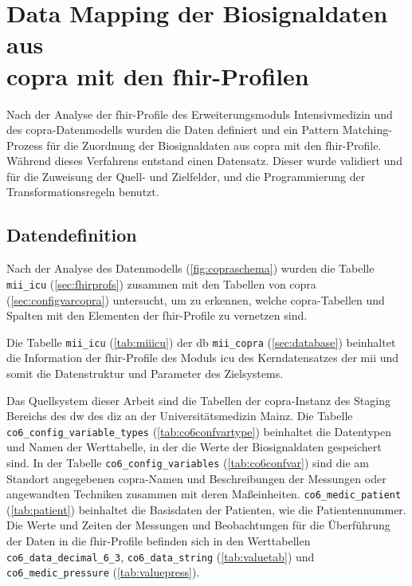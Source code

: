\section{Data Mapping der Biosignaldaten aus \\ \acs{copra} mit den \acs{fhir}-Profilen} \label{sec:datamappingicucopra}

Nach der Analyse der \ac{fhir}-Profile des Erweiterungsmoduls \glqq Intensivmedizin\grqq{} und des \ac{copra}-Datenmodells wurden die Daten definiert und ein Pattern Matching-Prozess für die Zuordnung der Biosignaldaten aus \ac{copra} mit den \ac{fhir}-Profile. Während dieses Verfahrens entstand einen Datensatz. Dieser wurde validiert und für die Zuweisung der Quell- und Zielfelder, und die Programmierung der Transformationsregeln benutzt.

\subsection{Datendefinition} \label{subsec:datadef}

Nach der Analyse des Datenmodells (\ref{fig:copraschema}) wurden die Tabelle \texttt{mii\_icu} (\ref{sec:fhirprofs}) zusammen mit den Tabellen von \ac{copra} (\ref{sec:configvarcopra}) untersucht, um zu erkennen, welche \ac{copra}-Tabellen und Spalten mit den Elementen der \ac{fhir}-Profile zu vernetzen sind.

Die Tabelle \texttt{mii\_icu} (\ref{tab:miiicu}) der \ac{db} \texttt{mii\_copra} (\ref{sec:database}) beinhaltet die Information der \ac{fhir}-Profile des Moduls \ac{icu} des Kerndatensatzes der \ac{mii} und somit die Datenstruktur und Parameter des Zielsystems.

Das Quellsystem dieser Arbeit sind die Tabellen der \ac{copra}-Instanz des Staging Bereichs des \ac{dw} des \ac{diz} an der Universitätsmedizin Mainz. Die Tabelle \texttt{co6\_config\_variable\_types} (\ref{tab:co6confvartype}) beinhaltet die Datentypen und Namen der Werttabelle, in der die Werte der Biosignaldaten gespeichert sind. In der Tabelle \texttt{co6\_config\_variables} (\ref{tab:co6confvar}) sind die am Standort angegebenen \ac{copra}-Namen und Beschreibungen der Messungen oder angewandten Techniken zusammen mit deren Maßeinheiten. \texttt{co6\_medic\_patient} (\ref{tab:patient}) beinhaltet die Basisdaten der Patienten, wie die Patientennummer. Die Werte und Zeiten der Messungen und Beobachtungen für die Überführung der Daten in die \ac{fhir}-Profile befinden sich in den Werttabellen \texttt{co6\_data\_decimal\_6\_3}, \texttt{co6\_data\_string} (\ref{tab:valuetab}) und \texttt{co6\_medic\_pressure} (\ref{tab:valuepress}).

